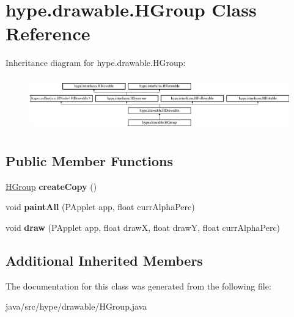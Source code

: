 \hypertarget{classhype_1_1drawable_1_1_h_group}{\section{hype.\-drawable.\-H\-Group Class Reference}
\label{classhype_1_1drawable_1_1_h_group}
}
Inheritance diagram for hype.\-drawable.\-H\-Group\-:\begin{figure}[H]
\begin{center}
\leavevmode
\includegraphics[height=2.333333cm]{classhype_1_1drawable_1_1_h_group}
\end{center}
\end{figure}
\subsection*{Public Member Functions}
\begin{DoxyCompactItemize}
\item 
\hypertarget{classhype_1_1drawable_1_1_h_group_a95a20a6436c9d906c966d21f3faf8959}{\hyperlink{classhype_1_1drawable_1_1_h_group}{H\-Group} {\bfseries create\-Copy} ()}\label{classhype_1_1drawable_1_1_h_group_a95a20a6436c9d906c966d21f3faf8959}

\item 
\hypertarget{classhype_1_1drawable_1_1_h_group_a7d3885ee1f32644cf76d83b6b8183102}{void {\bfseries paint\-All} (P\-Applet app, float curr\-Alpha\-Perc)}\label{classhype_1_1drawable_1_1_h_group_a7d3885ee1f32644cf76d83b6b8183102}

\item 
\hypertarget{classhype_1_1drawable_1_1_h_group_a25e5f6b92c1cc3e14b0a3880bea48689}{void {\bfseries draw} (P\-Applet app, float draw\-X, float draw\-Y, float curr\-Alpha\-Perc)}\label{classhype_1_1drawable_1_1_h_group_a25e5f6b92c1cc3e14b0a3880bea48689}

\end{DoxyCompactItemize}
\subsection*{Additional Inherited Members}


The documentation for this class was generated from the following file\-:\begin{DoxyCompactItemize}
\item 
java/src/hype/drawable/H\-Group.\-java\end{DoxyCompactItemize}
